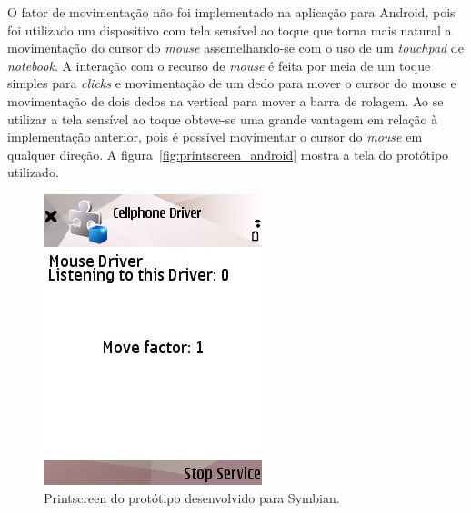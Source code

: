 O fator de movimentação não foi implementado na aplicação para Android, pois foi utilizado um dispositivo com tela sensível ao toque que torna mais natural a movimentação do cursor do \emph{mouse} assemelhando-se com o uso de um \emph{touchpad} de \emph{notebook}. A interação com o recurso de \emph{mouse} é feita por meia de um toque simples para \emph{clicks} e movimentação de um dedo para mover o cursor do mouse e movimentação de dois dedos na vertical para mover a barra de rolagem. Ao se utilizar a tela sensível ao toque obteve-se uma grande vantagem em relação à implementação anterior, pois é possível movimentar o cursor do \emph{mouse} em qualquer direção. A figura~\ref{fig:printscreen_android} mostra a tela do protótipo utilizado.	

\begin{figure}[h]
	\centering
	\begin{minipage}[t]{0.30\linewidth}
		\includegraphics[width=\linewidth]{imagens/printscreen_n95}
		\caption{Printscreen do protótipo desenvolvido para Symbian.}

\end{minipage}
\end{figure}
